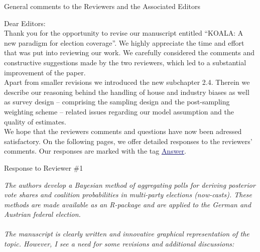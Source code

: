 \documentclass{scrartcl}
\newcommand{\blue}[1]{\textcolor{MidnightBlue}{\underline{\textcolor{MidnightBlue}{#1}}}}
\begin{document}
\begin{center}
\large General comments to the Reviewers and the Associated Editors
\end{center}

\vspace{5ex}

Dear Editors:
\\[2ex]
Thank you for the opportunity to revise our manuscript entitled ``KOALA: A new paradigm for election coverage''. We highly appreciate the time and effort that was put into reviewing our work. We carefully considered the comments and constructive suggestions made by the two reviewers, which led to
a substantial improvement of the paper.\\

Apart from smaller revisions we introduced the new subchapter 2.4. Therein we describe our reasoning behind the handling of house and industry biases as well as survey design -- comprising the sampling design and the post-sampling weighting scheme -- related issues regarding our model assumption and the quality of estimates.\\

We hope that the reviewers comments and questions have now been adressed
satisfactory. On the following pages, we offer detailed responses to the reviewers' comments. Our responses are marked with the tag \blue{Answer}.


\pagebreak
\begin{center}
\large Response to Reviewer \#1
\end{center}
\vspace{5ex}

\emph{
The authors develop a Bayesian method of aggregating polls for deriving posterior vote shares and coalition probabilities in multi-party elections (now-casts). These methods are made available as an R-package and are applied to the German and Austrian federal election.
\\ \\
The manuscript is clearly written and innovative graphical representation of the topic. However, I see a need for some revisions and additional discussions:
}
\end{document}
